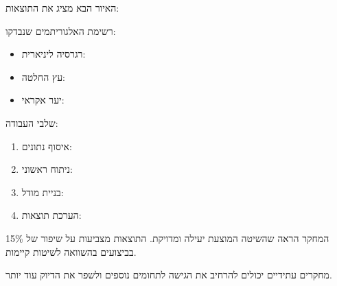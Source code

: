 \documentclass{hebrew-academic-template}
\begin{document}


האיור הבא מציג את התוצאות:




רשימת האלגוריתמים שנבדקו:

\begin{itemize}
\item רגרסיה ליניארית: 
\item עץ החלטה: 
\item יער אקראי: 
\end{itemize}

שלבי העבודה:

\begin{enumerate}
\item איסוף נתונים: 
\item ניתוח ראשוני: 
\item בניית מודל: 
\item הערכת תוצאות: 
\end{enumerate}



המחקר הראה שהשיטה המוצעת יעילה ומדויקת. התוצאות מצביעות על שיפור של \num{15}\% בביצועים בהשוואה לשיטות קיימות.

מחקרים עתידיים יכולים להרחיב את הגישה לתחומים נוספים ולשפר את הדיוק עוד יותר.


\newpage
\printenglishbibliography
\end{document}
